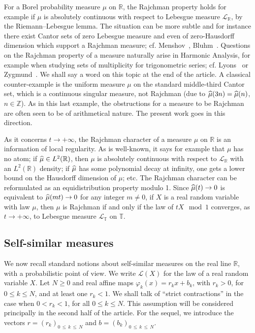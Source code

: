 \documentclass[10pt]{amsart}
\theoremstyle{definition}\newtheorem{defi}[theo]{Definition}\newtheorem{rema}[theo]{Remark}\newtheorem{exam}[theo]{Example}\newtheorem{exem}[theo]{Example}\newtheorem{nota}[theo]{Notation}
\newcommand{\Tbb}{\mathbb T}
\newcommand{\Rbb}{\mathbb R}
\newcommand{\Zbb}{\mathbb Z}
\newcommand{\Lcl}{\mathcal{L}}
\let\oldhat\hat
\renewcommand*{\hat}[1]{\mathchoice{\widehat{#1}}{\widehat{#1}}{\oldhat{#1}}{\oldhat{#1}}}
\begin{document}
For a Borel probability measure $\mu$ on $\Rbb$, the Rajchman property holds for example if $\mu$ is absolutely continuous with respect to Lebesgue measure ${\Lcl}_{\Rbb}$, by the Riemann--Lebesgue lemma. The situation can be more subtle and for instance there exist Cantor sets of zero Lebesgue measure and even of zero-Hausdorff dimension which support a Rajchman measure; cf. Menshov~\cite{menshov}, Bluhm~\cite{bluhm}. Questions on the Rajchman property of a measure naturally arise in Harmonic Analysis, for example when studying sets of multiplicity for trigonometric series; cf. Lyons~\cite{seven} or Zygmund~\cite{zyg}. We shall say a word on this topic at the end of the article. A classical counter-example is the uniform measure $\mu$ on the standard middle-third Cantor set, which is a continuous singular measure, not Rajchman (due to $\hat{\mu}(3n)\linebreak=\hat{\mu}(n)$, $n\in\Zbb$). As in this last example, the obstructions for a measure to be Rajchman are often seen to be of arithmetical nature. The present work goes in this direction.


As it concerns $t\rightarrow+\infty$, the Rajchman character of a measure $\mu$ on $\Rbb$ is an information of local regularity. As is well-known, it says for example that $\mu$ has no atom; if $\hat{\mu}\in L^2(\Rbb)$, then $\mu$ is absolutely continuous with respect to ${\Lcl}_{\Rbb}$ with an $L^2(\Rbb)$ density; if $\hat{\mu}$ has some polynomial decay at infinity, one gets a lower bound on the Hausdorff dimension of $\mu$; etc. The Rajchman character can be reformulated as an equidistribution property modulo 1. Since $\hat{\mu}(t)\rightarrow0$ is equivalent to $\hat{\mu}(mt)\rightarrow0$ for any integer $m\not=0$, if $X$ is a real random variable with law $\mu$, then $\mu$ is Rajchman if and only if the law of $tX\mod 1$ converges, as $t\rightarrow+\infty$, to Lebesgue measure ${\Lcl}_{\Tbb}$ on $\Tbb$.

\subsection*{Self-similar measures}
We now recall standard notions about self-similar measures on the real line $\Rbb$, with a probabilistic point of view. We write ${\Lcl}(X)$ for the law of a real random variable $X$. Let $N\geq0$ and real affine maps $\varphi_k(x)=r_kx+b_k$, with $r_k>0$, for $0\leq k\leq N$, and at least one $r_k<1$. We shall talk of ``strict contractions'' in the case when $0<r_k<1$, for all $0\leq k\leq N$. This assumption will be considered principally in the second half of the article. For the sequel, we introduce the vectors $r=(r_k)_{0\,\leq\,k\,\leq\,N}$ and $b=(b_k)_{0\,\leq\,k\,\leq\, N}$.
\end{document}
